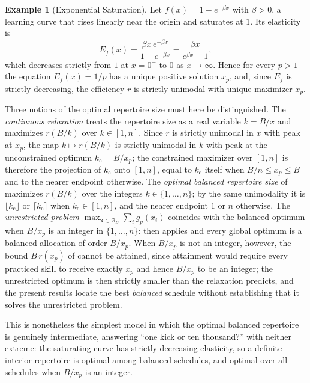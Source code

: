 \documentclass[11pt]{article}
\theoremstyle{definition}
\newtheorem{example}[theorem]{Example}
\theoremstyle{remark}
\newcommand{\vx}{\mathbf{x}}
\newcommand{\simplex}{\mathcal{B}}
\newcommand{\eff}{r}
\newcommand{\elas}{E}
\begin{document}
\begin{example}[Exponential Saturation]
\label{ex:exponential}
Let \(f(x)=1-e^{-\beta x}\) with \(\beta>0\), a learning curve that rises
linearly near the origin and saturates at \(1\). Its elasticity is
\[
    \elas_f(x)
    =
    \frac{\beta x\,e^{-\beta x}}{1-e^{-\beta x}}
    =
    \frac{\beta x}{e^{\beta x}-1},
\]
which decreases strictly from \(1\) at \(x=0^+\) to \(0\) as
\(x\to\infty\). Hence for every \(p>1\) the equation \(\elas_f(x)=1/p\) has a
unique positive solution \(x_p\), and, since \(\elas_f\) is strictly
decreasing, the efficiency \(\eff\) is strictly unimodal with unique
maximizer \(x_p\).

Three notions of the optimal repertoire size must here be distinguished.
The \emph{continuous relaxation} treats the repertoire size as a real
variable \(k=B/x\) and maximizes \(\eff(B/k)\) over \(k\in[1,n]\). Since
\(\eff\) is strictly unimodal in \(x\) with peak at \(x_p\), the map
\(k\mapsto\eff(B/k)\) is strictly unimodal in \(k\) with peak at the
unconstrained optimum \(k_{\mathrm c}=B/x_p\); the constrained maximizer
over \([1,n]\) is therefore the projection of \(k_{\mathrm c}\) onto
\([1,n]\), equal to \(k_{\mathrm c}\) itself when \(B/n\leq x_p\leq B\) and
to the nearer endpoint otherwise. The \emph{optimal balanced repertoire
size} of  maximizes \(\eff(B/k)\) over the integers
\(k\in\{1,\ldots,n\}\); by the same unimodality it is \(\lfloor
k_{\mathrm c}\rfloor\) or \(\lceil k_{\mathrm c}\rceil\) when
\(k_{\mathrm c}\in[1,n]\), and the nearer endpoint \(1\) or \(n\)
otherwise. The \emph{unrestricted problem}
\(\max_{\vx\in\simplex_B}\sum_i g_p(x_i)\) coincides with the balanced
optimum when \(B/x_p\) is an integer in \(\{1,\ldots,n\}\): then
 applies and every global optimum is a
balanced allocation of order \(B/x_p\). When \(B/x_p\) is not an
integer, however, the bound \(B\,\eff(x_p)\) of 
cannot be attained, since attainment would require every practiced skill to
receive exactly \(x_p\) and hence \(B/x_p\) to be an integer; the
unrestricted optimum is then strictly smaller than the relaxation predicts,
and the present results locate the best \emph{balanced} schedule without
establishing that it solves the unrestricted problem.

This is nonetheless the simplest model in which the optimal balanced
repertoire is genuinely intermediate, answering ``one kick or ten
thousand?'' with neither extreme: the saturating curve has strictly
decreasing elasticity, so a definite interior repertoire is optimal among
balanced schedules, and optimal over all schedules when \(B/x_p\) is an
integer.
\end{example}
\end{document}

